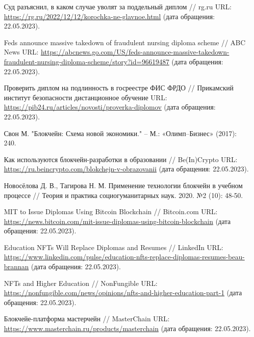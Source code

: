 \documentclass{mirea-article}
\begin{document}
\begin{thebibliography}{99\kern\bibindent}
	 Суд разъяснил, в каком случае уволят за поддельный диплом // rg.ru URL: \url{https://rg.ru/2022/12/12/korochka-ne-glavnoe.html} (дата обращения: 22.05.2023).

	 Feds announce massive takedown of fraudulent nursing diploma scheme // ABC News URL: \url{https://abcnews.go.com/US/feds-announce-massive-takedown-fraudulent-nursing-diploma-scheme/story?id=96619487} (дата обращения: 22.05.2023).

	 Проверить диплом на подлинность в госреестре ФИС ФРДО // Прикамский институт безопасности дистанционное обучение URL: \url{https://pib24.ru/articles/novosti/proverka-diplomov} (дата обращения: 22.05.2023).

	 Свон М. "Блокчейн: Схема новой экономики." – М.: «Олимп–Бизнес» (2017): 240.

	 Как используются блокчейн-разработки в образовании // Be(In)Crypto URL: \url{https://ru.beincrypto.com/blokchejn-v-obrazovanii} (дата обращения: 22.05.2023).

	 Новосёлова Д. В., Тагирова Н. М. Применение технологии блокчейн в учебном процессе // Теория и практика социогуманитарных наук. 2020. №2 (10): 48-50. %
	
	 MIT to Issue Diplomas Using Bitcoin Blockchain // Bitcoin.com URL: \url{https://news.bitcoin.com/mit-issue-diplomas-using-bitcoin-blockchain} (дата обращения: 22.05.2023).

	 Education NFTs Will Replace Diplomas and Resumes // LinkedIn URL: \url{https://www.linkedin.com/pulse/education-nfts-replace-diplomas-resumes-beau-brannan} (дата обращения: 22.05.2023).

	 NFTs and Higher Education // NonFungible URL: \url{https://nonfungible.com/news/opinions/nfts-and-higher-education-part-1} (дата обращения: 22.05.2023).

	 Блокчейе-платформа мастерчейн // MasterChain URL: \url{https://www.masterchain.ru/products/masterchain} (дата обращения: 22.05.2023).
\end{thebibliography}
\end{document}
